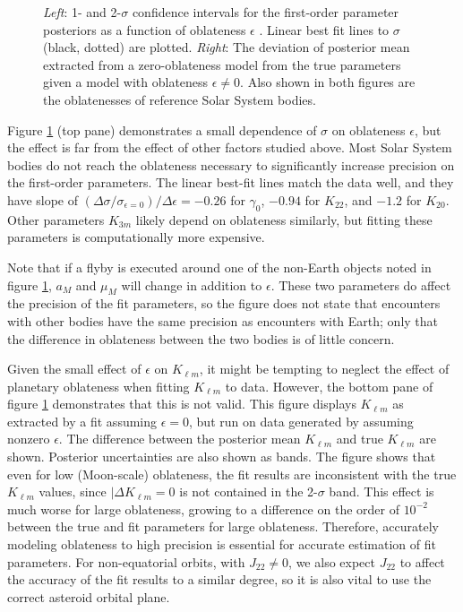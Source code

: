 \documentclass[fleqn,usenatbib]{mnras}
\begin{document}
\begin{figure}
  \caption{\textit{Left}: 1- and 2-$\sigma$ confidence intervals for the first-order parameter posteriors as a function of oblateness $\epsilon$ . Linear best fit lines to $\sigma$ (black, dotted) are plotted. \textit{Right}: The deviation of posterior mean extracted from a zero-oblateness model from the true parameters given a model with oblateness $\epsilon \neq 0$. Also shown in both figures are the oblatenesses of reference Solar System bodies.}
  \label{fig:scan-oblateness}
\end{figure}

Figure \ref{fig:scan-oblateness} (top pane) demonstrates a small dependence of $\sigma$ on oblateness $\epsilon$, but the effect is far from the effect of other factors studied above. Most Solar System bodies do not reach the oblateness necessary to significantly increase precision on the first-order parameters. The linear best-fit lines match the data well, and they have slope of $(\Delta \sigma / \sigma_{\epsilon=0}) / \Delta \epsilon = -0.26$ for $\gamma_0$, $-0.94$ for $K_{22}$, and $-1.2$ for $K_{20}$. Other parameters $K_{3m}$ likely depend on oblateness similarly, but fitting these parameters is computationally more expensive.

Note that if a flyby is executed around one of the non-Earth objects noted in figure \ref{fig:scan-oblateness}, $a_M$ and $\mu_M$ will change in addition to $\epsilon$. These two parameters do affect the precision of the fit parameters, so the figure does not state that encounters with other bodies have the same precision as encounters with Earth; only that the difference in oblateness between the two bodies is of little concern.

Given the small effect of $\epsilon$ on $K_{\ell m}$, it might be tempting to neglect the effect of planetary oblateness when fitting $K_{\ell m}$ to data. However, the bottom pane of figure \ref{fig:scan-oblateness} demonstrates that this is not valid. This figure displays $K_{\ell m}$ as extracted by a fit assuming $\epsilon = 0$, but run on data generated by assuming nonzero $\epsilon$. The difference between the posterior mean $K_{\ell m}$ and true $K_{\ell m}$ are shown. Posterior uncertainties are also shown as bands. The figure shows that even for low (Moon-scale) oblateness, the fit results are inconsistent with the true $K_{\ell m}$ values, since $|\Delta K_{\ell m} = 0$ is not contained in the 2-$\sigma$ band. This effect is much worse for large oblateness, growing to a difference on the order of $10^{-2}$ between the true and fit parameters for large oblateness. Therefore, accurately modeling oblateness to high precision is essential for accurate estimation of fit parameters. For non-equatorial orbits, with $J_{22} \neq 0$, we also expect $J_{22}$ to affect the accuracy of the fit results to a similar degree, so it is also vital to use the correct asteroid orbital plane.
\end{document}
